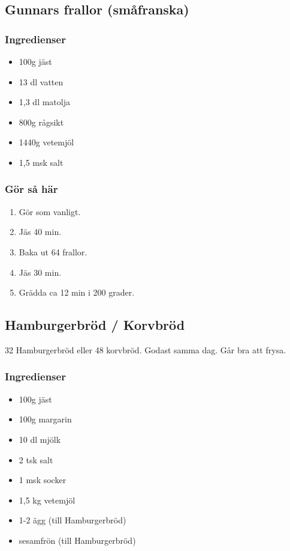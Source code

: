 \documentclass[a4paper,11pt,twocolumn]{article}
\begin{document}
\subsection{Gunnars frallor (småfranska)}
\subsubsection*{Ingredienser}
\begin{itemize}[noitemsep]
    \item 100g jäst
    \item 13 dl vatten
    \item 1,3 dl matolja
    \item 800g rågsikt
    \item 1440g vetemjöl
    \item 1,5 msk salt
\end{itemize}
\subsubsection*{Gör så här}
\begin{enumerate}[label=\arabic*.]
    \item Gör som vanligt.
    \item Jäs 40 min.
    \item Baka ut 64 frallor.
    \item Jäs 30 min.
    \item Grädda ca 12 min i 200 grader.
\end{enumerate}


\subsection{Hamburgerbröd / Korvbröd}
32 Hamburgerbröd eller 48 korvbröd. Godast samma dag. Går bra att frysa.
\subsubsection*{Ingredienser}
\begin{itemize}[noitemsep]
    \item 100g jäst
    \item 100g margarin
    \item 10 dl mjölk
    \item 2 tsk salt
    \item 1 msk socker
    \item 1,5 kg vetemjöl
    \item 1-2 ägg (till Hamburgerbröd)
    \item sesamfrön (till Hamburgerbröd)
\end{itemize}
\end{document}
